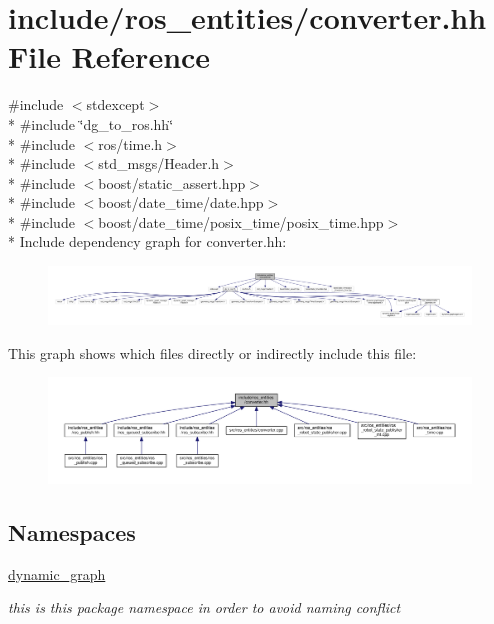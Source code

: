 \hypertarget{converter_8hh}{}\section{include/ros\+\_\+entities/converter.hh File Reference}
\label{converter_8hh}
{\ttfamily \#include $<$stdexcept$>$}\\*
{\ttfamily \#include \char`\"{}dg\+\_\+to\+\_\+ros.\+hh\char`\"{}}\\*
{\ttfamily \#include $<$ros/time.\+h$>$}\\*
{\ttfamily \#include $<$std\+\_\+msgs/\+Header.\+h$>$}\\*
{\ttfamily \#include $<$boost/static\+\_\+assert.\+hpp$>$}\\*
{\ttfamily \#include $<$boost/date\+\_\+time/date.\+hpp$>$}\\*
{\ttfamily \#include $<$boost/date\+\_\+time/posix\+\_\+time/posix\+\_\+time.\+hpp$>$}\\*
Include dependency graph for converter.\+hh\+:
\nopagebreak
\begin{figure}[H]
\begin{center}
\leavevmode
\includegraphics[width=350pt]{converter_8hh__incl}
\end{center}
\end{figure}
This graph shows which files directly or indirectly include this file\+:
\nopagebreak
\begin{figure}[H]
\begin{center}
\leavevmode
\includegraphics[width=350pt]{converter_8hh__dep__incl}
\end{center}
\end{figure}
\subsection*{Namespaces}
\begin{DoxyCompactItemize}
\item 
 \hyperlink{namespacedynamic__graph}{dynamic\+\_\+graph}
\begin{DoxyCompactList}\small\item\em this is this package namespace in order to avoid naming conflict \end{DoxyCompactList}\end{DoxyCompactItemize}
